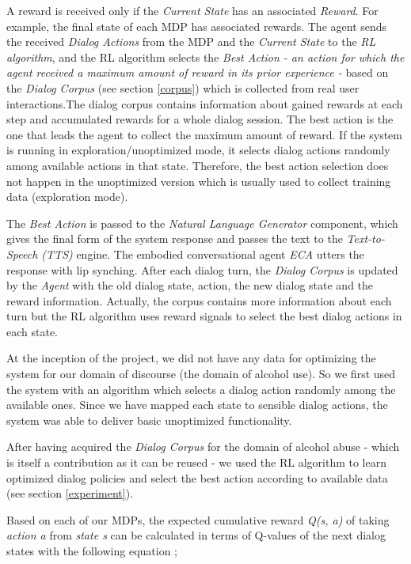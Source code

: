 \begin{sloppy}
A reward is received only if the {\em Current State} has an associated {\em Reward}. For example, the final state of each MDP has associated rewards. The agent sends the received {\em Dialog Actions} from the MDP and the {\em Current State} to the {\em RL algorithm}, and the RL algorithm selects the {\em Best Action - an action for which the agent received a maximum amount of reward in its prior experience -} based on the {\em Dialog Corpus} (see section \ref{corpus}) which is collected from real user interactions.The dialog corpus contains information about gained rewards at each step and accumulated rewards for a whole dialog session.  The best action is the one that leads the agent to collect the maximum amount of reward. If the system is running in exploration/unoptimized mode, it selects dialog actions randomly among available actions in that state. Therefore, the best action selection does not happen in the unoptimized version which is usually used to collect training data (exploration mode).

The {\em Best Action} is passed to the {\em Natural Language Generator} component, which gives the final form of the system response and passes the text to the {\em Text-to-Speech (TTS)} engine. The embodied conversational agent {\em ECA} utters the  response with lip synching.  After each dialog turn, the {\em Dialog Corpus} is updated by the {\em Agent} with the old dialog state, action, the new dialog state and the reward information. Actually, the corpus contains more information about each turn but the RL algorithm uses reward signals to select the best dialog actions in each state.


At the inception of the project, we did not have any data for optimizing the system for our domain of discourse (the domain of alcohol use). So we first used the system with an algorithm which selects a dialog action randomly among the available ones. Since we have mapped each state to sensible dialog actions, the system was able to deliver basic unoptimized functionality. 


After having acquired the {\em Dialog Corpus} for the domain of alcohol abuse - which is itself a contribution as it can be reused - we used the RL algorithm to learn optimized dialog policies and select the best action according to available data (see section \ref{experiment}).

Based on each of our MDPs, the expected cumulative reward \textit{Q(s, a)} of taking \textit{action a} from \textit{state s} can be calculated in terms of Q-values of the next dialog states with the following equation \cite{sutton1998reinforcement};



\end{sloppy}
